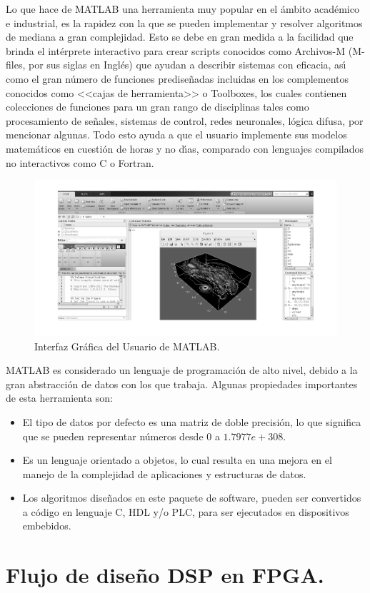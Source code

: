 Lo que hace de MATLAB una herramienta muy popular en el \'{a}mbito
acad\'{e}mico e industrial, es la rapidez con la que se pueden implementar
y resolver algoritmos de mediana a gran complejidad. Esto se debe
en gran medida a la facilidad que brinda el int\'{e}rprete interactivo
para crear scripts conocidos como Archivos-M (M-files, por sus siglas
en Ingl\'{e}s) que ayudan a describir sistemas con eficacia, as\'{\i}
como el gran n\'{u}mero de funciones predise\~{n}adas incluidas en
los complementos conocidos como <<cajas de herramienta>> o Toolboxes,
los cuales contienen colecciones de funciones para un gran rango de
disciplinas tales como procesamiento de se\~{n}ales, sistemas de control,
redes neuronales, l\'{o}gica difusa, por mencionar algunas. Todo esto
ayuda a que el usuario implemente sus modelos matem\'{a}ticos en cuesti\'{o}n
de horas y no d\'{\i}as, comparado con lenguajes compilados no interactivos
como C o Fortran.

\begin{figure}[H]
\begin{centering}
\includegraphics[scale=0.45]{img/matlab_env}
\par\end{centering}
\caption{Interfaz Gr\'{a}fica del Usuario de MATLAB.}

\end{figure}

MATLAB es considerado un lenguaje de programaci\'{o}n de alto nivel,
debido a la gran abstracci\'{o}n de datos con los que trabaja. Algunas
propiedades importantes de esta herramienta son:
\begin{itemize}
\item El tipo de datos por defecto es una matriz de doble precisi\'{o}n,
lo que significa que se pueden representar n\'{u}meros desde 0 a $1.7977e+308$.
\item Es un lenguaje orientado a objetos, lo cual resulta en una mejora
en el manejo de la complejidad de aplicaciones y estructuras de datos. 
\item Los algoritmos dise\~{n}ados en este paquete de software, pueden ser
convertidos a c\'{o}digo en lenguaje C, HDL y/o PLC, para ser ejecutados
en dispositivos embebidos.
\end{itemize}

\section{Flujo de dise\~{n}o DSP en FPGA.}

\newpage{}
